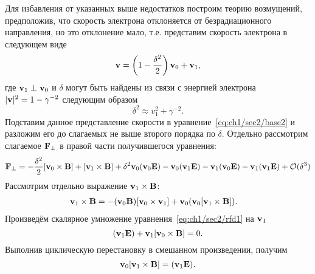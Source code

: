 Для избавления от указанных выше недостатков построим теорию возмущений, предположив, что скорость электрона отклоняется от безрадиационного направления, но это отклонение мало, т.е. представим скорость электрона в следующем виде
\begin{equation}
    \vb{v}=\left( 1 - \frac{\delta^2}{2} \right) \vb{v}_0 + \vb{v}_1,
\end{equation}
где $\vb{v}_1\perp\vb{v}_0$ и $\delta$ могут быть найдены из связи с энергией электрона ${|\vb{v}|^2= 1-\gamma^{-2}}$ следующим образом
\begin{equation}
    \delta^2\approx v_1^2+\gamma^{-2}.
\end{equation}
% 
% 
Подставим данное представление скорости в уравнение~\eqref{eq:ch1/sec2/base2} и разложим его до слагаемых не выше второго порядка по $\delta$. 
Отдельно рассмотрим слагаемое $\vb{F}_\perp$ в правой части получившегося уравнения:
\begin{equation}
    \begin{multlined}[t]
        \vb{F}_\perp = -\frac{\delta^2}{2} [\vb{v}_0 \times \vb{B}] + [\vb{v}_1 \times \vb{B}]  + \delta^2 \vb{v}_0(\vb{v}_0 \vb{E}) - \vb{v}_0(\vb{v}_1 \vb{E}) - \vb{v}_1(\vb{v}_0 \vb{E}) - \vb{v}_1(\vb{v}_1 \vb{E}) + \mathcal{O}(\delta^3)
    \end{multlined}
\end{equation}
Рассмотрим отдельно выражение $\vb{v}_1 \times \vb{B}$:
\begin{equation}
    \label{eq:ch1/sec4/v1b}
    \begin{aligned}
         & \vb{v}_1 \times \vb{B} = -(\vb{v}_0 \vb{B})[\vb{v}_0 \times \vb{v}_1] + \vb{v}_0 (\vb{v}_0[\vb{v}_1\times \vb{B}]).
    \end{aligned}
\end{equation}
Произведём скалярное умножение уравнения~\eqref{eq:ch1/sec2/rfd1} на $\vb{v}_1$
\begin{equation}
    (\vb{v}_1 \vb{E}) + \vb{v}_1 [\vb{v}_0\times \vb{B}] = 0.
\end{equation}
Выполнив циклическую перестановку в смешанном произведении, получим
\begin{equation}
    \label{eq:ch1/sec4/v0v1B}
    \vb{v}_0 [\vb{v}_1\times \vb{B}] = (\vb{v}_1 \vb{E}).
\end{equation}
